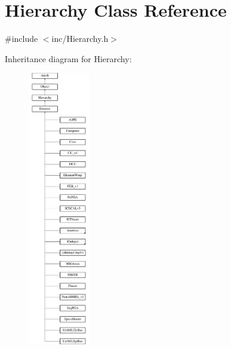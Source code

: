 \hypertarget{classHierarchy}{}\section{Hierarchy Class Reference}
\label{classHierarchy}


{\ttfamily \#include $<$inc/\+Hierarchy.\+h$>$}

Inheritance diagram for Hierarchy\+:\begin{figure}[H]
\begin{center}
\leavevmode
\includegraphics[height=12.000000cm]{classHierarchy}
\end{center}
\end{figure}
